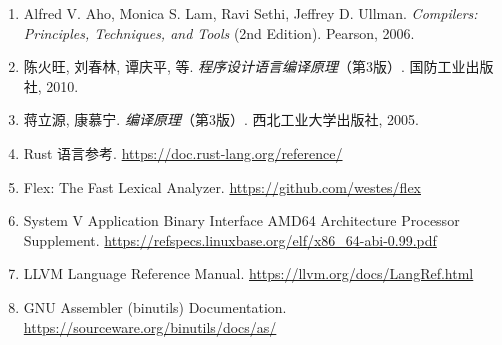\documentclass[12pt,a4paper]{ctexart}
\begin{document}
\begin{enumerate}
    \item Alfred V. Aho, Monica S. Lam, Ravi Sethi, Jeffrey D. Ullman. \textit{Compilers: Principles, Techniques, and Tools} (2nd Edition). Pearson, 2006.
    \item 陈火旺, 刘春林, 谭庆平, 等. \textit{程序设计语言编译原理}（第3版）. 国防工业出版社, 2010.
    \item 蒋立源, 康慕宁. \textit{编译原理}（第3版）. 西北工业大学出版社, 2005.
    \item Rust 语言参考. \url{https://doc.rust-lang.org/reference/}
    \item Flex: The Fast Lexical Analyzer. \url{https://github.com/westes/flex}
    \item System V Application Binary Interface AMD64 Architecture Processor Supplement. \url{https://refspecs.linuxbase.org/elf/x86_64-abi-0.99.pdf}
    \item LLVM Language Reference Manual. \url{https://llvm.org/docs/LangRef.html}
    \item GNU Assembler (binutils) Documentation. \url{https://sourceware.org/binutils/docs/as/}
\end{enumerate}
\end{document}
